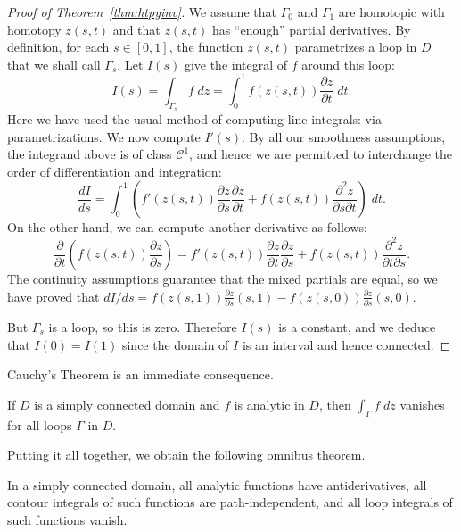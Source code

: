 \documentclass[twocolumn,12pt]{article}
\begin{document}
\begin{proof}[Proof of Theorem~\ref{thm:htpyinv}]
    We assume that $\Gamma_0$ and $\Gamma_1$ are homotopic with homotopy $z(s,t)$ and that $z(s,t)$ has ``enough'' partial derivatives. By definition, for each $s \in [0,1]$, the function $z(s,t)$ parametrizes a loop in $D$ that we shall call $\Gamma_s$. Let $I(s)$ give the integral of $f$ around this loop:
    \[
        I(s) = \int_{\Gamma_s} f \; dz = \int_0^1 f(z(s,t)) \frac{\partial z}{\partial t} \; dt.
    \]
    Here we have used the usual method of computing line integrals: via parametrizations. We now compute $I'(s)$. By all our smoothness assumptions, the integrand above is of class $\mathcal{C}^1$, and hence we are permitted to interchange the order of differentiation and integration:
    \begin{equation*}
        \frac{dI}{ds} = \int_0^1 \left(f'(z(s,t)) \frac{\partial z}{\partial s} \frac{\partial z}{\partial t} + f(z(s,t)) \frac{\partial^2 z}{\partial s \partial t} \right) \; dt.
    \end{equation*}
    On the other hand, we can compute another derivative as follows:
    \[
        \frac{\partial}{\partial t} \left( f(z(s,t)) \frac{\partial z}{\partial s} \right) = f'(z(s,t)) \frac{\partial z}{\partial t} \frac{\partial z}{\partial s} + f(z(s,t)) \frac{\partial^2 z}{\partial t \partial s}.
    \]
    The continuity assumptions guarantee that the mixed partials are equal, so we have proved that $dI/ds = f(z(s,1)) \frac{\partial z}{\partial s}(s,1) - f(z(s,0)) \frac{\partial z}{\partial s}(s,0)$.

    But $\Gamma_s$ is a loop, so this is zero. Therefore $I(s)$ is a constant, and we deduce that $I(0) = I(1)$ since the domain of $I$ is an interval and hence connected.
\end{proof}
Cauchy's Theorem is an immediate consequence.
\begin{Theorem}
    If $D$ is a simply connected domain and $f$ is analytic in $D$, then $\int_{\Gamma} f \; dz$ vanishes for all loops $\Gamma$ in $D$.
\end{Theorem}
Putting it all together, we obtain the following omnibus theorem.
\begin{Theorem}
    In a simply connected domain, all analytic functions have antiderivatives, all contour integrals of such functions are path-independent, and all loop integrals of such functions vanish.
\end{Theorem}
\end{document}
